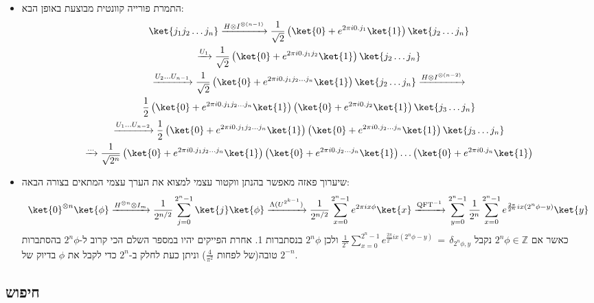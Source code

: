 \documentclass{tstextbook}
\begin{document}
\begin{summary}
  \begin{itemize}
    \item התמרת פורייה קוונטית מבוצעת באופן הבא:
$$\begin{gather}\ket{j_1 j_2 \dots j_n} \xrightarrow{H \otimes I^{\otimes (n-1)}} \frac{1}{\sqrt{2}} \left( \ket{0} + e^{2\pi i 0.j_1} \ket{1} \right) \ket{j_2 \dots j_n}  \\\xrightarrow{U_1} \frac{1}{\sqrt{2}} \left( \ket{0} + e^{2\pi i 0.j_1 j_2} \ket{1} \right) \ket{j_2 \dots j_n}  \\\xrightarrow{U_2 \dots U_{n-1}} \frac{1}{\sqrt{2}} \left( \ket{0} + e^{2\pi i 0.j_1 j_2 \dots j_n} \ket{1} \right) \ket{j_2 \dots j_n}\xrightarrow{H \otimes I^{\otimes (n-2)}}  \\\frac{1}{2} \left( \ket{0} + e^{2\pi i 0.j_1 j_2 \dots j_n} \ket{1} \right) \left( \ket{0} + e^{2\pi i 0.j_2} \ket{1} \right) \ket{j_3 \dots j_n}  \\\xrightarrow{U_1 \dots U_{n-2}} \frac{1}{2} \left( \ket{0} + e^{2\pi i 0.j_1 j_2 \dots j_n} \ket{1} \right) \left( \ket{0} + e^{2\pi i 0.j_2 \dots j_n} \ket{1} \right) \ket{j_3 \dots j_n} \\\xrightarrow{\dots}  \frac{1}{\sqrt{2^n}} \left( \ket{0} + e^{2\pi i 0.j_1 j_2 \dots j_n} \ket{1} \right) \left( \ket{0} + e^{2\pi i 0.j_2 \dots j_n} \ket{1} \right) \dots \left( \ket{0} + e^{2\pi i 0.j_n} \ket{1} \right)
\end{gather}$$
    \item שיערוך פאזה מאפשר בהנתן ווקטור עצמי למצוא את הערך עצמי המתאים בצורה הבאה:
$$\begin{gather}\ket{0}^{\otimes n} \ket{\phi} \xrightarrow{H^{\otimes n} \otimes I_m} \frac{1}{2^{n/2}} \sum_{j=0}^{2^n-1} \ket{j} \ket{\phi} \xrightarrow{\Lambda(U^{2^{k-1}})} \frac{1}{2^{n/2}} \sum_{x=0}^{2^n-1} e^{2\pi i x\phi} \ket{x} \xrightarrow{\text{QFT}^{-1}} \sum_{y=0}^{2^n-1} \frac{1}{2^n} \sum_{x=0}^{2^n-1} e^{\frac{2\pi}{2^n} i x (2^n \phi - y)} \ket{y}
\end{gather}$$
כאשר אם \(2^{n}\phi \in \mathbb{Z}\) נקבל \(\frac{1}{2^{n}}\sum_{x=0}^{2^{n}-1}e^{\frac{2\pi}{2^{n}}i x(2^{n}\phi-y)}\,=\,\delta_{2^{n}\phi,y}\) ולכן \(2^{n}\phi\) בנסתברות 1. אחרת הפייקים יהיו במספר השלם הכי קרוב ל-\(2^{n}\phi\) בהסתברות טובה(של לפחות \(\frac{4}{\pi^{2}}\)) וניתן כעת לחלק ב-\(2^{n}\) כדי לקבל את \(\phi\) בדיוק של \(2^{-n}\).
  \end{itemize}
\end{summary}
\subsection{חיפוש}
\end{document}
